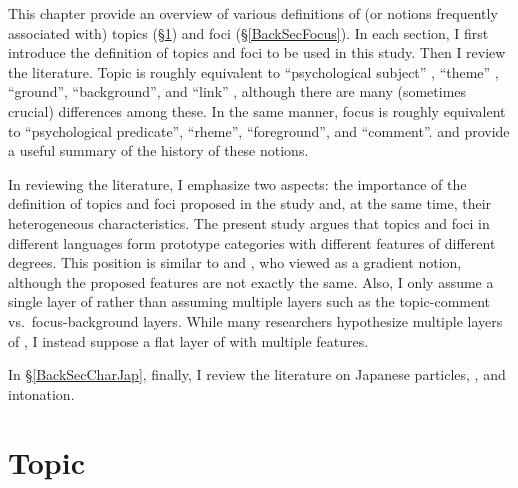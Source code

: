 This chapter provide an overview of various definitions of (or notions frequently associated with) topics (\S \ref{BackSecTopic}) and foci (\S \ref{BackSecFocus}).
In each section,
I first introduce the definition of topics and foci to be used in this study.
Then I review the literature.
Topic is roughly equivalent to ``psychological subject'' \cite{gabelentz69}, ``theme'' \cite[e.g.,][]{danes70,halliday04}, ``ground'', ``background'', and ``link'' \cite{vallduvi94},
although there are many (sometimes crucial) differences among these.
In the same manner,
focus is roughly equivalent to ``psychological predicate'', ``rheme'', ``foreground'', and ``comment''.
 and  provide a useful summary of the history of these notions.

In reviewing the literature,
I emphasize two aspects:
the importance of the definition of topics and foci proposed in the study and, at the same time,
their heterogeneous characteristics.
The present study argues that topics and foci in different languages form prototype categories with different features of different degrees.
This position is similar to  and ,
who viewed  as a gradient notion,
although the proposed features are not exactly the same.
Also, I only assume a single layer of 
rather than assuming multiple layers such as the topic-comment vs.~focus-background layers.
While many researchers hypothesize multiple layers of ,
I instead suppose a flat layer of  with multiple features.


In \S \ref{BackSecCharJap}, finally,
I review the literature on Japanese particles, , and intonation.


\section{Topic}\label{BackSecTopic}


